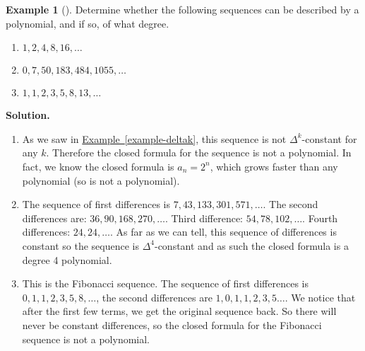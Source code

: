\documentclass[10pt,]{book}
\theoremstyle{plain}
\theoremstyle{definition}
\theoremstyle{definition}
\newtheorem{example}[theorem]{Example}
\theoremstyle{definition}
\theoremstyle{definition}
\numberwithin{equation}{chapter}
\begin{document}
\begin{example}[]\label{example-17}
\hypertarget{p-251}{}%
Determine whether the following sequences can be described by a polynomial, and if so, of what degree. \leavevmode%
\begin{enumerate}
\item\hypertarget{li-159}{}\(1, 2, 4, 8, 16, \ldots\)%
\item\hypertarget{li-160}{}\(0, 7, 50, 183, 484, 1055, \ldots\)%
\item\hypertarget{li-161}{}\(1,1,2,3,5,8,13,\ldots\)%
\end{enumerate}
%
\par\smallskip%
\noindent\textbf{Solution.}\hypertarget{solution-28}{}\quad%
\hypertarget{p-252}{}%
\leavevmode%
\begin{enumerate}
\item\hypertarget{li-162}{}\hypertarget{p-253}{}%
As we saw in \hyperref[example-deltak]{Example~\ref{example-deltak}}, this sequence is not \(\Delta^k\)-constant for any \(k\). Therefore the closed formula for the sequence is not a polynomial. In fact, we know the closed formula is \(a_n = 2^n\), which grows faster than any polynomial (so is not a polynomial).%
\item\hypertarget{li-163}{}\hypertarget{p-254}{}%
The sequence of first differences is \(7, 43, 133, 301, 571,\ldots\). The second differences are: \(36, 90, 168, 270,\ldots\). Third difference: \(54, 78, 102,\ldots\). Fourth differences: \(24, 24, \ldots\). As far as we can tell, this sequence of differences is constant so the sequence is \(\Delta^4\)-constant and as such the closed formula is a degree 4 polynomial.%
\item\hypertarget{li-164}{}\hypertarget{p-255}{}%
This is the Fibonacci sequence. The sequence of first differences is \(0, 1, 1, 2, 3, 5, 8, \ldots\), the second differences are \(1, 0, 1, 1, 2, 3, 5\ldots\). We notice that after the first few terms, we get the original sequence back. So there will never be constant differences, so the closed formula for the Fibonacci sequence is not a polynomial.%
\end{enumerate}
%
\end{example}
\typeout{************************************************}
\typeout{************************************************}
\end{document}
